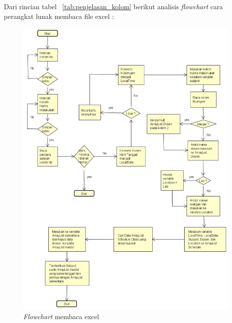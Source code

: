 Dari rincian tabel ~\ref{tab:penjelasan_kolom} berikut analisis \textit{flowchart} cara perangkat lunak membaca file excel : 
\begin{figure}[H]
	\centering
	\includegraphics[scale=0.5]{Gambar/FlowchartBacaExcel}
	\caption{\textit{Flowchart} membaca excel}
	\label{fig:flowchartMembacaExcel}
	\end{figure}

